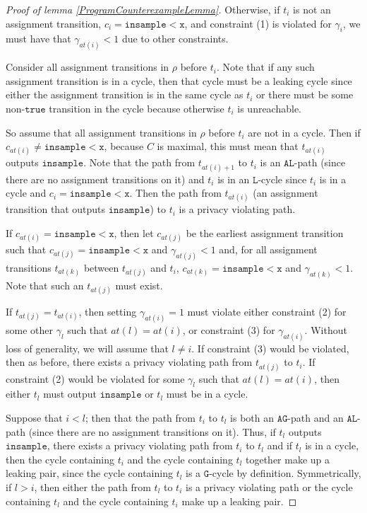 \documentclass[12pt]{article}
\newcommand{\lguard}[1][x]{\texttt{insample} < #1}
\theoremstyle{definition}
\begin{document}
\begin{proof}[Proof of lemma \ref{ProgramCounterexampleLemma}]
    Otherwise, if $t_i$ is not an assignment transition, $c_i = \lguard[\texttt{x}]$, and constraint (1) is violated for $\gamma_i$, we must have that $\gamma_{at(i)}<1$ due to other constraints.
    
    Consider all assignment transitions in $\rho$ before $t_i$. Note that if any such assignment transition is in a cycle, then that cycle must be a leaking cycle since either the assignment transition is in the same cycle as $t_i$ or there must be some non-$\texttt{true}$ transition in the cycle because otherwise $t_i$ is unreachable.

    So assume that all assignment transitions in $\rho$ before $t_i$ are not in a cycle. Then if $c_{at(i)} \neq \lguard[\texttt{x}]$, because $C$ is maximal, this must mean that $t_{at(i)}$ outputs $\texttt{insample}$. Note that the path from $t_{at(i)+1}$ to $t_i$ is an $\texttt{AL}$-path (since there are no assignment transitions on it) and $t_i$ is in an $\texttt{L}$-cycle since $t_i$ is in a cycle and $c_i = \lguard[\texttt{x}]$. 
    Then the path from $t_{at(i)}$ (an assignment transition that outputs $\texttt{insample}$) to $t_i$ is a privacy violating path. 

    If $c_{at(i)} = \lguard[\texttt{x}]$, then let $c_{at(j)}$ be the earliest assignment transition such that $c_{at(j)} = \lguard[\texttt{x}]$ and $\gamma_{at(j)} < 1$ and, for all assignment transitions $t_{at(k)}$ between $t_{at(j)}$ and $t_i$, $c_{at(k)} = \lguard[\texttt{x}]$ and $\gamma_{at(k)} < 1$. Note that such an $t_{at(j)}$ must exist. 

    If $t_{at(j)} = t_{at(i)}$, then setting $\gamma_{at(i)} =1$ must violate either constraint (2) for some other $\gamma_l$ such that $at(l)=at(i)$, or constraint (3) for $\gamma_{at(i)}$. Without loss of generality, we will assume that $l\neq i$. If constraint (3) would be violated, then as before, there exists a privacy violating path from $t_{at(j)}$ to $t_i$. 
    If constraint (2) would be violated for some $\gamma_l$ such that $at(l)=at(i)$, then either $t_l$ must output $\texttt{insample}$ or $t_l$ must be in a cycle. 
    
    Suppose that $i<l$; then that the path from $t_i$ to $t_l$ is both an $\texttt{AG}$-path and an $\texttt{AL}$-path (since there are no assignment transitions on it). Thus, if $t_l$ outputs $\texttt{insample}$, there exists a privacy violating path from $t_i$ to $t_l$ and if $t_l$ is in a cycle, then the cycle containing $t_i$ and the cycle containing $t_l$ together make up a leaking pair, since the cycle containing $t_l$ is a $\texttt{G}$-cycle by definition. 
    Symmetrically, if $l>i$, then either the path from $t_l$ to $t_i$ is a privacy violating path or the cycle containing $t_l$ and the cycle containing $t_i$ make up a leaking pair.
    

\end{proof}
\end{document}

